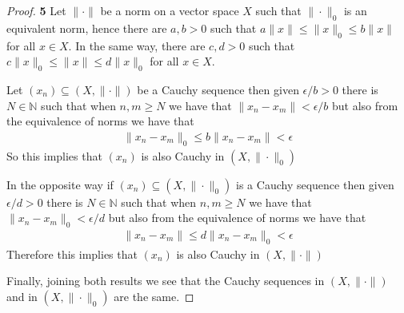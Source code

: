 \documentclass[11pt]{article}
\newcommand{\N}{\mathbb{N}}
\theoremstyle{definition}
\begin{document}
\cleardoublepage
\begin{proof}{\textbf{5}}
    Let $\|\cdot\|$  be a norm on a vector space $X$ such that
    $\|\cdot\|_0$ is an equivalent norm, hence there are $a,b > 0$
    such that $a\|x\| \leq \|x\|_0 \leq b\|x\|$ for all $x \in X$.
    In the same way, there are $c,d>0$ such that 
    $c\|x\|_0 \leq \|x\| \leq d\|x\|_0$ for all $x \in X$.

    Let $(x_n) \subseteq (X, \|\cdot\|)$ be a Cauchy sequence then given
    $\epsilon/b > 0$ there is $N \in \N$ such that when $n,m \geq N$
    we have that $\|x_n - x_m\| < \epsilon/b$ but also from the equivalence of
    norms we have that
    \begin{align*}
        \|x_n - x_m\|_0 \leq b\|x_n - x_m\| < \epsilon
    \end{align*}
    So this implies that $(x_n)$ is also Cauchy in $(X, \|\cdot\|_0)$

    In the opposite way if $(x_n) \subseteq (X, \|\cdot\|_0)$ is a Cauchy
    sequence then given $\epsilon/d > 0$ there is $N \in \N$ such that when
    $n,m \geq N$ we have that $\|x_n - x_m\|_0 < \epsilon/d$ but also from the
    equivalence of norms     we have that
    \begin{align*}
        \|x_n - x_m\| \leq d\|x_n - x_m\|_0 < \epsilon
    \end{align*}
    Therefore this implies that $(x_n)$ is also Cauchy in $(X, \|\cdot\|)$

    Finally, joining both results we see that the Cauchy sequences in
    $(X, \|\cdot\|)$ and in $(X, \|\cdot\|_0)$ are the same.
\end{proof}
\end{document}
